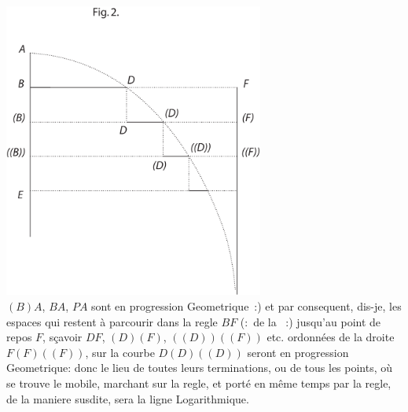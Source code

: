\pend
\newpage
\pstart
\centering
 \noindent
\includegraphics[trim = 0mm 0mm 0mm 0mm, clip, width=0.64\textwidth]{images/lh0350911_004r-d3.pdf}\\
\pend
\vspace{1em} 
\pstart\noindent $\displaystyle (B)A$, $\displaystyle BA$, $\displaystyle PA$
sont en progression Geometrique~:)
et par consequent, dis-je,
les espaces qui restent \`{a} parcourir dans la regle $\displaystyle BF$
(:~de la ~:)
jusqu'au point de repos $\displaystyle F$,
s\c{c}avoir $\displaystyle DF$, $\displaystyle (D)(F)$, $\displaystyle ((D))((F))$ etc.
ordonn\'{e}es de la droite $\displaystyle F(F)((F))$, sur la courbe $\displaystyle D(D)((D))$
seront en progression Geometrique:
donc le lieu de toutes leurs terminations,
ou de tous les points,
o\`{u} se trouve le mobile,
marchant sur la regle,
et port\'{e} en m\^{e}me temps par la regle,
de la maniere susdite,
sera la ligne Logarithmique.%
